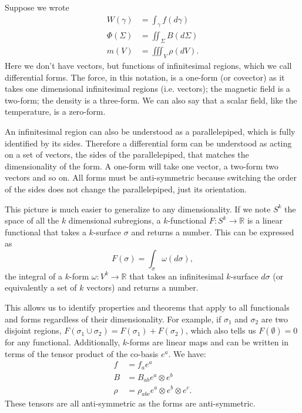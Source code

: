 \documentclass[fleqn,10pt]{wlscirep}
\begin{document}
Suppose we wrote
\begin{equation*}
\begin{aligned}
	W(\gamma) &= \int_\gamma f(d\gamma) \\
	\Phi(\Sigma) &= \iint_\Sigma B(d\Sigma) \\
	m(V) &= \iiint_V \rho(dV).
\end{aligned}
\end{equation*}
Here we don't have vectors, but functions of infinitesimal regions, which we call differential forms. The force, in this notation, is a one-form (or covector) as it takes one dimensional infinitesimal regions (i.e. vectors); the magnetic field is a two-form; the density is a three-form. We can also say that a scalar field, like the temperature, is a zero-form.

An infinitesimal region can also be understood as a parallelepiped, which is fully identified by its sides. Therefore a differential form can be understood as acting on a set of vectors, the sides of the parallelepiped, that matches the dimensionality of the form. A one-form will take one vector, a two-form two vectors and so on. All forms must be anti-symmetric because switching the order of the sides does not change the parallelepiped, just its orientation.

This picture is much easier to generalize to any dimensionality. If we note $S^k$ the space of all the $k$ dimensional subregions, a $k$-functional $F : S^k \to \mathbb{R}$ is a linear functional that takes a $k$-surface $\sigma$ and returns a number. This can be expressed as
\begin{equation*}
	F(\sigma) = \int_\sigma \omega(d\sigma),
\end{equation*}
the integral of a $k$-form $\omega : V^k \to \mathbb{R}$ that takes an infinitesimal $k$-surface $d\sigma$ (or equivalently a set of $k$ vectors) and returns a number.

This allows us to identify properties and theorems that apply to all functionals and forms regardless of their dimensionality. For example, if $\sigma_1$ and $\sigma_2$ are two disjoint regions, $F(\sigma_1 \cup \sigma_2) = F(\sigma_1) + F(\sigma_2)$, which also tells us $F(\emptyset) = 0$ for any functional. Additionally, $k$-forms are linear maps and can be written in terms of the tensor product of the co-basis $e^a$. We have:
\begin{equation*}
	\begin{aligned}
		f &= f_a e^a \\
		B &= B_{ab} e^a \otimes e^b \\
		\rho &= \rho_{abc} e^a \otimes e^b \otimes e^c.
	\end{aligned}
\end{equation*}
These tensors are all anti-symmetric as the forms are anti-symmetric.
\end{document}
